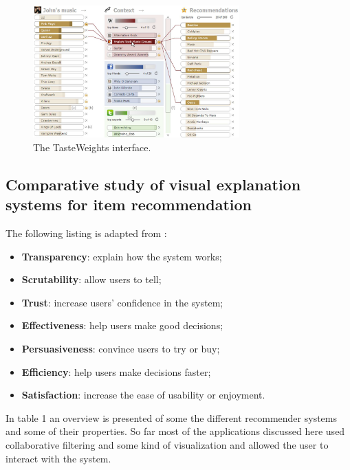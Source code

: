 \begin{figure}%
	\begin{center}
		\includegraphics[width=300px]{img/tasteweights}%
	\end{center}
	\caption{The TasteWeights interface.}%
	\label{figure:tasteweights}%
\end{figure}








\subsection{Comparative study of visual explanation systems for item recommendation}

 The following listing is adapted from \cite{tintarev:2007:SER:1547550.1547664}:

\begin{itemize}
	\item \textbf{Transparency}: explain how the system works;
	\item \textbf{Scrutability}: allow users to tell;
	\item \textbf{Trust}: increase users' confidence in the system;
	\item \textbf{Effectiveness}: help users make good decisions;
	\item \textbf{Persuasiveness}: convince users to try or buy;
	\item \textbf{Efficiency}: help users make decisions faster;
	\item \textbf{Satisfaction}: increase the ease of usability or enjoyment.
\end{itemize}

In table 1 an overview is presented of some the different recommender systems and some of their properties. So far most of the applications discussed here used collaborative filtering and some kind of visualization and allowed the user to interact with the system.


